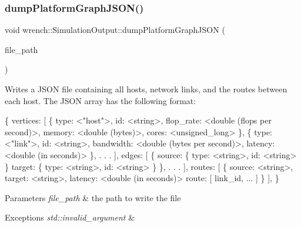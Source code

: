 \subsubsection{\texorpdfstring{dump\+Platform\+Graph\+J\+S\+O\+N()}{dumpPlatformGraphJSON()}}
{\footnotesize\ttfamily void wrench\+::\+Simulation\+Output\+::dump\+Platform\+Graph\+J\+S\+ON (\begin{DoxyParamCaption}\item[{std\+::string}]{file\+\_\+path }\end{DoxyParamCaption})}



Writes a J\+S\+ON file containing all hosts, network links, and the routes between each host.  The J\+S\+ON array has the following format\+: 


\begin{DoxyPre}
\{
   vertices: [
       \{
           type: <"host">,
           id: <string>,
           flop\_rate: <double (flops per second)>,
           memory: <double (bytes)>,
           cores: <unsigned\_long>
       \},
       \{
           type: <"link">,
           id: <string>,
           bandwidth: <double (bytes per second)>,
           latency: <double (in seconds)>
       \}, . . .
   ],
   edges: [
       \{
           source: \{
               type: <string>,
               id: <string>
           \}
           target: \{
               type: <string>,
               id: <string>
          \}
       \}, . . .
   ],
  routes: [
      \{
          source: <string>,
          target: <string>,
          latency: <double (in seconds)>
          route: [
              link\_id, ...
          ]
      \}
  ],
\}
\end{DoxyPre}



\begin{DoxyParams}{Parameters}
{\em file\+\_\+path} & the path to write the file\\
\hline
\end{DoxyParams}

\begin{DoxyExceptions}{Exceptions}
{\em std\+::invalid\+\_\+argument} & \\
\hline
\end{DoxyExceptions}
\mbox{\label{classwrench_1_1_simulation_output_a7a85709b2581c90b53c217e6805cf56c}} 
